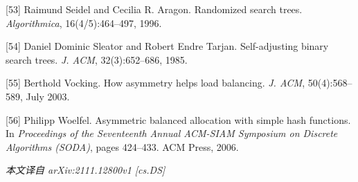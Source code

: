 \documentclass[12pt,a4paper]{ctexart}
\theoremstyle{remark}
\begin{document}
[53] Raimund Seidel and Cecilia R. Aragon. Randomized search trees. \textit{Algorithmica}, 16(4/5):464--497, 1996.

[54] Daniel Dominic Sleator and Robert Endre Tarjan. Self-adjusting binary search trees. \textit{J. ACM}, 32(3):652--686, 1985.

[55] Berthold Vocking. How asymmetry helps load balancing. \textit{J. ACM}, 50(4):568--589, July 2003.

[56] Philipp Woelfel. Asymmetric balanced allocation with simple hash functions. In \textit{Proceedings of the Seventeenth Annual ACM-SIAM Symposium on Discrete Algorithms (SODA)}, pages 424--433. ACM Press, 2006.

\medskip
\textit{本文译自 arXiv:2111.12800v1 [cs.DS]}
\end{document}
